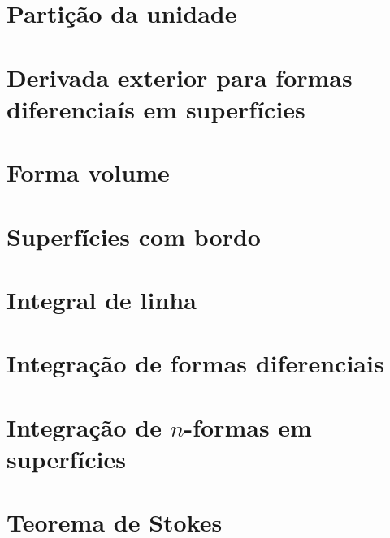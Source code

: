 \section{Partição da unidade}

\section{Derivada exterior para formas diferenciaís em superfícies}

\section{Forma volume}

\section{Superfícies com bordo}

\section{Integral de linha}

\section{Integração de formas diferenciais}

\section{Integração de \texorpdfstring{$n$}{n}-formas em superfícies}

\section{Teorema de Stokes}

